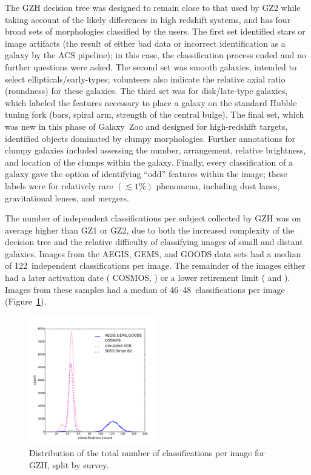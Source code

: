\documentclass[twocolumn]{aastex6}
\begin{document}
The GZH decision tree was designed to remain close to that used by GZ2 while
taking account of the likely differences in high redshift systems, and has four
broad sets of morphologies classified by the users.  The first set
identified stars or image artifacts (the result of either bad data or incorrect
identification as a galaxy by the ACS pipeline); in this case, the
classification process ended and no further questions were asked. The second
set was smooth galaxies, intended to select ellipticals/early-types;
volunteers also indicate the relative axial ratio (roundness) for these
galaxies. The third set was for disk/late-type galaxies, which labeled the
features necessary to place a galaxy on the standard Hubble tuning fork (bars,
spiral arm, strength of the central bulge). The final set, which was new in
this phase of Galaxy~Zoo and designed for high-redshift targets, identified
objects dominated by clumpy morphologies. Further annotations for clumpy
galaxies included assessing the number, arrangement, relative brightness, and
location of the clumps within the galaxy. Finally, every classification of a
galaxy gave the option of identifying ``odd'' features within the image; these
labels were for relatively rare $(\lesssim1\%)$ phenomena, including dust
lanes, gravitational lenses, and mergers. 

The number of independent classifications per subject collected by GZH was on
average higher than GZ1 or GZ2, due to both the increased complexity of the
decision tree and the relative difficulty of classifying images of small and
distant galaxies. Images from the \main{} AEGIS, GEMS, and GOODS data sets had
a median of 122~independent classifications per image. The remainder of the
images either had a later activation date (\main{} COSMOS, \simagn) or a lower
retirement limit (\stripe{} and \coadd). Images from these samples had a median
of 46--48~classifications per image (Figure~\ref{fig:classification_hist}).

\begin{figure}
\center
\includegraphics[width=0.5\textwidth]{figures/classification_hist.pdf}
\caption{Distribution of the total number of classifications per image for GZH,
split by survey.}
\label{fig:classification_hist}
\end{figure}
\end{document}
